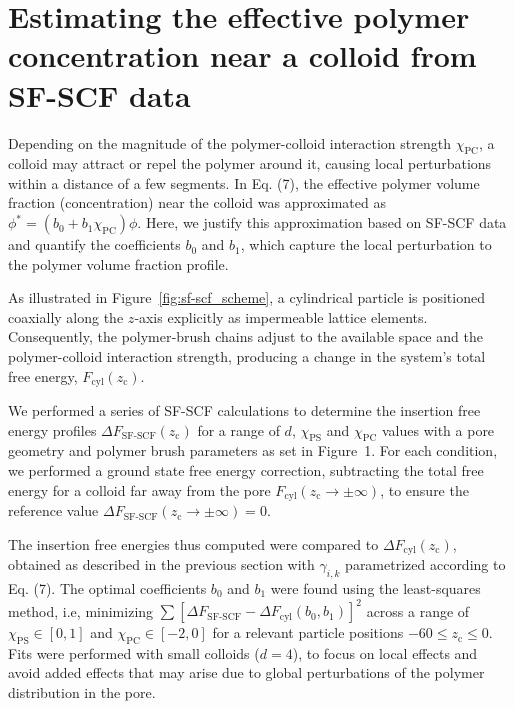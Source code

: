 \documentclass[10pt, a4paper]{article}
\begin{document}
\section{Estimating the effective polymer concentration near a colloid from SF-SCF data}
\begin{multicols}{2}

Depending on the magnitude of the polymer-colloid interaction strength $\chi_{\text{PC}}$, a colloid may attract or repel the polymer around it, causing local perturbations within a distance of a few segments.
In Eq. (7), the effective polymer volume fraction (concentration) near the colloid was approximated as $\phi^{\ast} = (b_0 + b_1 \chi_{\text{PC}}) \phi$.
Here, we justify this approximation based on SF-SCF data and quantify the coefficients $b_0$ and $b_1$, which capture the local perturbation to the polymer volume fraction profile.

As illustrated in Figure~\ref{fig:sf-scf_scheme}, a cylindrical particle is positioned coaxially along the $z$‑axis explicitly as impermeable lattice elements.
Consequently, the polymer‑brush chains adjust to the available space and the polymer-colloid interaction strength, producing a change in the system's total free energy, $F_{\text{cyl}}(z_{\text{c}})$.

We performed a series of SF-SCF calculations to determine the insertion free energy profiles $\Delta F_{\text{SF-SCF}}(z_{\text{c}})$ for a range of $d$, $\chi_{\text{PS}}$ and $\chi_{\text{PC}}$ values with a pore geometry and polymer brush parameters as set in Figure~1.
For each condition, we performed a ground state free energy correction, subtracting the total free energy for a colloid far away from the pore $F_{\text{cyl}}(z_{\text{c}} \to \pm \infty)$, to ensure the reference value $\Delta F_{\text{SF-SCF}}(z_{\text{c}} \to \pm \infty) = 0$.

The insertion free energies thus computed were compared to $\Delta F_{\text{cyl}}(z_{\text{c}})$, obtained as described in the previous section with $\gamma_{i,k}$ parametrized according to Eq. (7).
The optimal coefficients $b_0$ and $b_1$ were found using the least-squares method, i.e, minimizing $\sum [\Delta F_{\text{SF-SCF}} - \Delta F_{\text{cyl}}(b_0,b_1)]^2$ across a range of $\chi_{\text{PS}} \in [0,1]$  and $\chi_{\text{PC}} \in [-2,0]$ for a relevant particle positions $-60 \leq z_{\text{c}} \leq 0$.
Fits were performed with small colloids ($d=4$), to focus on local effects and avoid added effects that may arise due to global perturbations of the polymer distribution in the pore.


\end{multicols}
\end{document}
